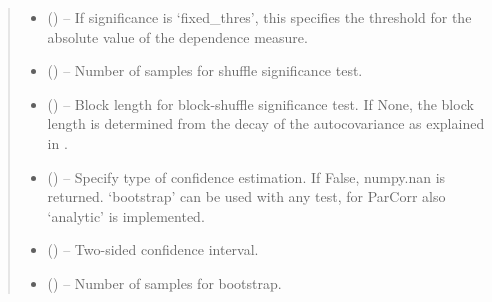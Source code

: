\documentclass[letterpaper,10pt,english]{sphinxmanual}
\begin{document}
\begin{fulllineitems}
\begin{quote}
\begin{description}
\begin{itemize}
\item {} 
 (\sphinxstyleliteralemphasis{, }\sphinxstyleliteralemphasis{ (}\sphinxstyleliteralemphasis{)}\sphinxstyleliteralemphasis{}) -- If significance is `fixed\_thres', this specifies the threshold for the
absolute value of the dependence measure.

\item {} 
 (\sphinxstyleliteralemphasis{, }\sphinxstyleliteralemphasis{ (}\sphinxstyleliteralemphasis{)}\sphinxstyleliteralemphasis{}) -- Number of samples for shuffle significance test.

\item {} 
 (\sphinxstyleliteralemphasis{, }\sphinxstyleliteralemphasis{ (}\sphinxstyleliteralemphasis{)}\sphinxstyleliteralemphasis{}) -- Block length for block-shuffle significance test. If None, the
block length is determined from the decay of the autocovariance as
explained in \sphinxfootnotemark[1].

\item {} 
 (\sphinxstyleliteralemphasis{, }\sphinxstyleliteralemphasis{ (}\sphinxstyleliteralemphasis{)}\sphinxstyleliteralemphasis{}) -- Specify type of confidence estimation. If False, numpy.nan is returned.
`bootstrap' can be used with any test, for ParCorr also `analytic' is
implemented.

\item {} 
 (\sphinxstyleliteralemphasis{, }\sphinxstyleliteralemphasis{ (}\sphinxstyleliteralemphasis{)}\sphinxstyleliteralemphasis{}) -- Two-sided confidence interval.

\item {} 
 (\sphinxstyleliteralemphasis{, }\sphinxstyleliteralemphasis{ (}\sphinxstyleliteralemphasis{)}\sphinxstyleliteralemphasis{}) -- Number of samples for bootstrap.


\end{itemize}
\end{description}
\end{quote}
\end{fulllineitems}
\end{document}
